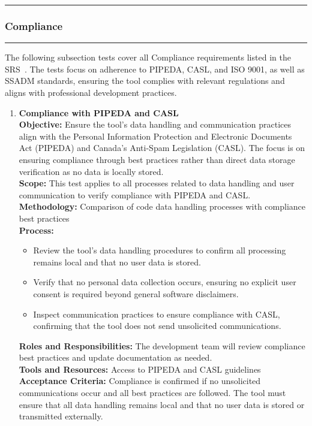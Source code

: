 \documentclass[12pt, titlepage]{article}
\newcommand{\colorrule}{\textcolor{BlueViolet}{\rule{\linewidth}{2pt}}}
\begin{document}
  \newpage

  \noindent
  \colorrule

  \subsubsection{Compliance}
  \colorrule

  \medskip

  \noindent
  The following subsection tests cover all Compliance requirements
  listed in the SRS~\cite{SRS}. The tests focus on adherence to
  PIPEDA, CASL, and ISO 9001, as well as SSADM standards, ensuring
  the tool complies with relevant regulations and aligns with
  professional development practices.

  \begin{enumerate}[label={\bf
      \textcolor{Maroon}{test-CPL-\arabic*}}, wide=0pt, font=\itshape]
    \item \textbf{Compliance with PIPEDA and CASL} \\[2mm]
      \textbf{Objective:} Ensure the tool’s data handling and
      communication practices align with the Personal Information
      Protection and Electronic Documents Act (PIPEDA) and Canada’s
      Anti-Spam Legislation (CASL). The focus is on ensuring
      compliance through best practices rather than direct data
      storage verification as no data is locally stored. \\[2mm]
      \textbf{Scope:} This test applies to all processes related to
      data handling and user communication to verify compliance with
      PIPEDA and CASL. \\[2mm]
      \textbf{Methodology:} Comparison of code data handling
      processes with compliance best practices \\[2mm]
      \textbf{Process:}
      \begin{itemize}
        \item Review the tool’s data handling procedures to confirm
          all processing remains local and that no user data is stored.
        \item Verify that no personal data collection occurs,
          ensuring no explicit user consent is required beyond
          general software disclaimers.
        \item Inspect communication practices to ensure compliance
          with CASL, confirming that the tool does not send
          unsolicited communications.
      \end{itemize}
      \textbf{Roles and Responsibilities:} The development team will
      review compliance best practices and update documentation as
      needed. \\[2mm]
      \textbf{Tools and Resources:} Access to PIPEDA and CASL guidelines \\[2mm]
      \textbf{Acceptance Criteria:} Compliance is confirmed if no
      unsolicited communications occur and all best practices are
      followed. The tool must ensure that all data handling remains
      local and that no user data is stored or transmitted externally.


\end{enumerate}
\end{document}
